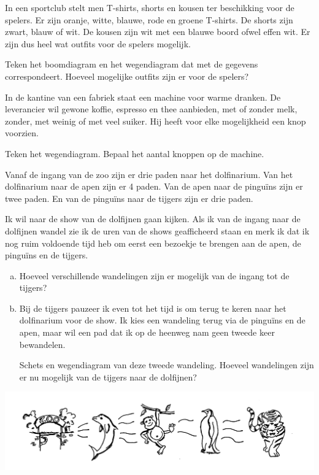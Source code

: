 \documentclass[12pt,twoside]{article}
\begin{document}
\begin{question}
In een sportclub stelt men T-shirts, shorts en kousen ter beschikking voor de spelers. Er zijn oranje, witte, blauwe, rode en groene T-shirts. De shorts zijn zwart, blauw of wit. De kousen zijn wit met een blauwe boord ofwel effen wit. Er zijn dus heel wat outfits voor de spelers mogelijk.

Teken het boomdiagram en het wegendiagram dat met de gegevens correspondeert. Hoeveel mogelijke outfits zijn er voor de spelers?
\end{question}

\begin{oefening}
In de kantine van een fabriek staat een machine voor warme dranken. De leverancier wil gewone koffie, espresso en thee aanbieden, met of zonder melk, zonder, met weinig of met veel suiker. Hij heeft voor elke mogelijkheid een knop voorzien.

Teken het wegendiagram. Bepaal het aantal knoppen op de machine.
\end{oefening}

\begin{oefening}
Vanaf de ingang van de zoo zijn er drie paden naar het dolfinarium. Van het dolfinarium naar de apen zijn er 4 paden. Van de apen naar de pinguïns zijn er twee paden. En van de pinguïns naar de tijgers zijn er drie paden.

Ik wil naar de show van de dolfijnen gaan kijken. Als ik van de ingang naar de dolfijnen wandel zie ik de uren van de shows geafficheerd staan en merk ik dat ik nog ruim voldoende tijd heb om eerst een bezoekje te brengen aan de apen, de pinguïns en de tijgers.

\begin{enumerate}[(a)]
  \item Hoeveel verschillende wandelingen zijn er mogelijk van de ingang tot de tijgers?
  \item Bij de tijgers pauzeer ik even tot het tijd is om terug te keren naar het dolfinarium voor de show. Ik kies een wandeling terug via de pinguïns en de apen, maar wil een pad dat ik op de heenweg nam geen tweede keer bewandelen.
  
  Schets en wegendiagram van deze tweede wandeling. Hoeveel wandelingen zijn er nu mogelijk van de tijgers naar de dolfijnen?
\end{enumerate}

\begin{center}
  \includegraphics[width=\textwidth]{zoodieren}
\end{center}
\end{oefening}
\end{document}
